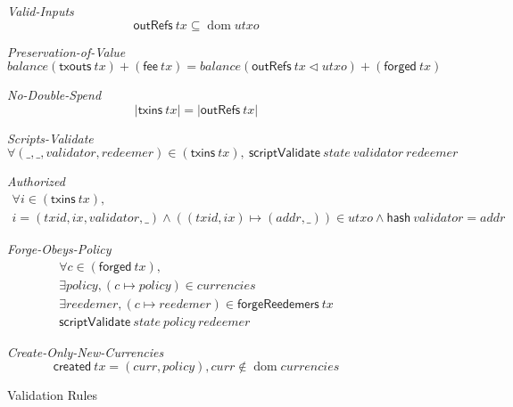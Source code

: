 \documentclass[11pt,a4paper]{article}
\DeclareMathOperator{\dom}{dom}
\newcommand{\restrictdom}{\lhd}
\newcommand{\var}[1]{\mathit{#1}}
\newcommand{\fun}[1]{\mathsf{#1}}
\newcommand{\scriptValidate}[3]{\fun{scriptValidate} ~ \var{#1} ~ \var{#2} ~ \var{#3}}
\newcommand{\txins}[1]{\fun{txins}\ \var{#1}}
\newcommand{\txouts}[1]{\fun{txouts}\ \var{#1}}
\newcommand{\hash}[1]{\fun{hash}\ \var{#1}}
\newcommand{\forged}[1]{\fun{forged}\ \var{#1}}
\newcommand{\forgeReedemers}[1]{\fun{forgeReedemers}\ \var{#1}}
\newcommand{\fee}[1]{\fun{fee}\ \var{#1}}
\newcommand{\created}[1]{\fun{created}\ \var{#1}}
\newcommand{\outRefs}[1]{\fun{outRefs}\ \var{#1}}
\begin{document}
\begin{figure}
\emph{Valid-Inputs}
%
\begin{equation*}
\outRefs{tx} \subseteq \dom \var{utxo}
\end{equation*}

\emph{Preservation-of-Value}
%
\begin{equation*}
balance (\txouts tx) + (\fee tx)
  = balance (\outRefs tx \restrictdom utxo) + (\forged tx)
\end{equation*}

\emph{No-Double-Spend}
%
\begin{equation*}
\lvert \txins tx \rvert = \lvert \outRefs tx\rvert
\end{equation*}

\emph{Scripts-Validate}
%
\begin{equation*}
\forall (\_, \_, validator, redeemer)\in(\txins tx),
~ \scriptValidate{state}{validator}{redeemer}
\end{equation*}

\emph{Authorized}
%
\begin{equation*}
\begin{array}{c}
  \forall i\in(\txins tx),\\
    i = (txid, ix, validator, \_)
    \land ((txid, ix) \mapsto (addr, \_)) \in \var{utxo}
    \land \hash validator = addr
\end{array}
\end{equation*}

\emph{Forge-Obeys-Policy}
%
\begin{equation*}
\begin{array}{c}
\forall c\in(\forged tx), \\
\exists policy, (c \mapsto policy) \in \var{currencies} \\
\exists reedemer, (c \mapsto reedemer) \in \forgeReedemers tx \\
\scriptValidate{state}{policy}{redeemer}
\end{array}
\end{equation*}

\emph{Create-Only-New-Currencies}
%
\begin{equation*}
\created tx = (curr, policy), curr \notin \dom currencies
\end{equation*}

\caption{Validation Rules}
\label{fig:validation_rules}
\end{figure}
\end{document}
